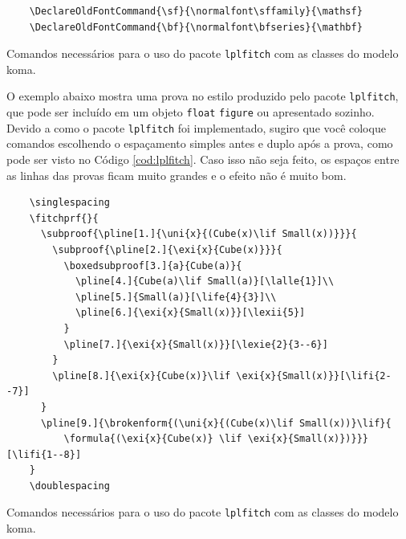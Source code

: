 \begin{listing}[ht]
	\begin{verbatim}
	\DeclareOldFontCommand{\sf}{\normalfont\sffamily}{\mathsf}
	\DeclareOldFontCommand{\bf}{\normalfont\bfseries}{\mathbf}
	\end{verbatim} 
	\caption{Comandos necessários para o uso do pacote \texttt{lplfitch} \parencite{lplfitch} com as classes do modelo \gls{koma}.}
	\label{cod:lplfitch-setup}
\end{listing}

O exemplo abaixo mostra uma prova no estilo produzido pelo pacote \texttt{lplfitch}, que pode ser incluído em um objeto \texttt{float} \texttt{figure} ou apresentado sozinho. Devido a como o pacote \texttt{lplfitch} foi implementado, sugiro que você coloque comandos escolhendo o espaçamento simples antes e duplo após a prova, como pode ser visto no Código \ref{cod:lplfitch}. Caso isso não seja feito, os espaços entre as linhas das provas ficam muito grandes e o efeito não é muito bom.

\singlespacing
{}
\doublespacing

\begin{listing}[ht]
	\begin{verbatim}
	\singlespacing
	\fitchprf{}{
	  \subproof{\pline[1.]{\uni{x}{(Cube(x)\lif Small(x))}}}{
	    \subproof{\pline[2.]{\exi{x}{Cube(x)}}}{
	      \boxedsubproof[3.]{a}{Cube(a)}{
	        \pline[4.]{Cube(a)\lif Small(a)}[\lalle{1}]\\
	        \pline[5.]{Small(a)}[\life{4}{3}]\\
	        \pline[6.]{\exi{x}{Small(x)}}[\lexii{5}]
	      }
	      \pline[7.]{\exi{x}{Small(x)}}[\lexie{2}{3--6}]
	    }
	    \pline[8.]{\exi{x}{Cube(x)}\lif \exi{x}{Small(x)}}[\lifi{2--7}]
	  }
	  \pline[9.]{\brokenform{(\uni{x}{(Cube(x)\lif Small(x))}\lif}{
	      \formula{(\exi{x}{Cube(x)} \lif \exi{x}{Small(x)})}}}[\lifi{1--8}]
	}
	\doublespacing
	\end{verbatim} 
	\caption{Comandos necessários para o uso do pacote \texttt{lplfitch} \parencite{lplfitch} com as classes do modelo \gls{koma}.}
	\label{cod:lplfitch}
\end{listing}

